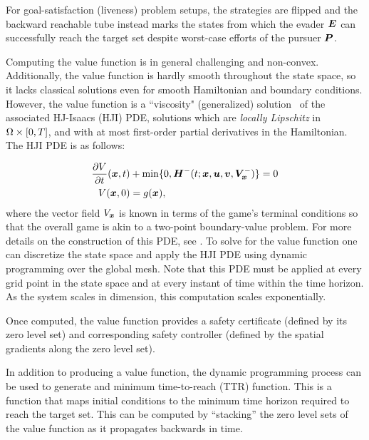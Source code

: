 For goal-satisfaction (liveness) problem setups, the strategies are flipped and the backward reachable tube instead marks the states from which the evader $\bm{E}$ can successfully reach the target set despite worst-case efforts of the pursuer $\bm{P}$.



Computing the value function is in general challenging and non-convex. Additionally, the value function is hardly smooth throughout the state space, so it lacks classical solutions even for smooth Hamiltonian and boundary conditions. However, the value function is a ``viscosity" (generalized)  solution~\cite{Lions1982, Crandall1983viscosity} of the associated HJ-Isaacs (HJI) PDE, \ie solutions which are \textit{locally Lipschitz} in $\Omega \times [0, T]$, and with at most first-order partial derivatives in the Hamiltonian.  The HJI PDE is as follows:

\begin{subequations}
	\begin{align}
		\frac{\partial V}{\partial t}{(\bm{x}, t)} & + \min \{0, \bm{H}^- (t; \bm{x}, \bm{u}, \bm{v},\bm{V}^-_{\bm{x}}) \} = 0 \\
		V(\bm{x},0) &= g(\bm{x}),
	\end{align}
	\label{eq:lower_hji_pde}
\end{subequations}
%
\noindent where the vector field $V_{\bm{x}}$ is known in terms of the game's terminal conditions so that the overall game is akin to a two-point boundary-value problem. For more details on the construction of this PDE, see \cite{Mitchell2005}.
To solve for the value function one can discretize the state space and apply the HJI PDE using dynamic programming over the global mesh.  
Note that this PDE must be applied at every grid point in the state space and at every instant of time within the time horizon. As the system scales in dimension, this computation scales exponentially.

Once computed, the value function provides a safety certificate (defined by its zero level set) and corresponding safety controller (defined by the spatial gradients along the zero level set). 

In addition to producing a value function, the dynamic programming process can be used to generate and minimum time-to-reach (TTR) function. This is a function that maps initial conditions to the minimum time horizon required to reach the target set.  This can be computed by ``stacking'' the zero level sets of the value function as it propagates backwards in time. 


